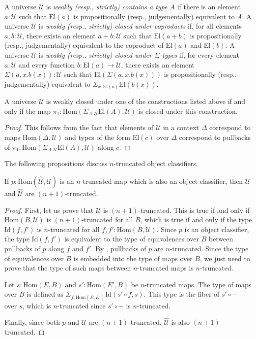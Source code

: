 \documentclass[reqno]{amsart}
\theoremstyle{definition}
\theoremstyle{remark}
\newcommand{\fs}[1]{\mathrm{#1}}
\newcommand{\Hom}{\fs{Hom}}
\newcommand{\Id}{\fs{Id}}
\newcommand{\El}{\fs{El}}
\numberwithin{figure}{section}
\begin{document}
A universe $\mathcal{U}$ is \emph{weakly (resp., strictly) contains a type $A$} if there is an element $a : \mathcal{U}$ such that $\El(a)$ is propositionally (resp., judgementally) equivalent to $A$. 
A universe $\mathcal{U}$ is \emph{weakly (resp., strictly) closed under coproducts} if, for all elements $a,b : \mathcal{U}$, there exists an element $a + b : \mathcal{U}$ such that $\El(a + b)$ is propositionally (resp., judgementally) equivalent to the coproduct of $\El(a)$ and $\El(b)$.
A universe $\mathcal{U}$ is \emph{weakly (resp., strictly) closed under $\Sigma$-types} if, for every element $a : \mathcal{U}$ and every function $b : \El(a) \to \mathcal{U}$, there exists an element $\Sigma(a,x.b(x)) : \mathcal{U}$ such that $\El(\Sigma(a,x.b(x)))$ is propositionally (resp., judgementally) equivalent to $\Sigma_{x : \El(a)} \El(b(x))$.

\begin{prop}
A universe $\mathcal{U}$ is weakly closed under one of the constructions listed above if and only if the map $\pi_1 : \Hom(\Sigma_{A : \mathcal{U}} \El(A), \mathcal{U})$ is closed under this construction.
\end{prop}
\begin{proof}
This follows from the fact that elements of $\mathcal{U}$ in a context $\Delta$ correspond to maps $\Hom(\Delta, \mathcal{U})$ and
types of the form $\El(c)$ over $\Delta$ correspond to pullbacks of $\pi_1 : \Hom(\Sigma_{A : \mathcal{U}} \El(A), \mathcal{U})$ along $c$.
\end{proof}

The following propositions discuss $n$-truncated object classifiers.

\begin{prop}
If $p : \Hom(\widehat{\mathcal{U}},\mathcal{U})$ is an $n$-truncated map which is also an object classifier, then $\mathcal{U}$ and $\widehat{\mathcal{U}}$ are $(n+1)$-truncated.
\end{prop}
\begin{proof}
First, let us prove that $\mathcal{U}$ is $(n+1)$-truncated.
This is true if and only if $\Hom(B,\mathcal{U})$ is $(n+1)$-truncated for all $B$, which is true if and only if the type $\Id(f,f')$ is $n$-truncated for all $f,f' : \Hom(B,\mathcal{U})$.
Since $p$ is an object classifier, the type $\Id(f,f')$ is equivalent to the type of equivalences over $B$ between pullbacks of $p$ along $f$ and $f'$.
By , pullbacks of $p$ are $n$-truncated.
Since the type of equivalences over $B$ is embedded into the type of maps over $B$, we just need to prove that the type of such maps between $n$-truncated maps is $n$-truncated.

Let $s : \Hom(E,B)$ and $s' : \Hom(E',B)$ be $n$-truncated maps.
The type of maps over $B$ is defined as $\Sigma_{f : \Hom(E,E')} \Id(s' \circ f, s)$.
This type is the fiber of $s' \circ -$ over $s$, which is $n$-truncated since $s' \circ -$ is $n$-truncated.

Finally, since both $p$ and $\mathcal{U}$ are $(n+1)$-truncated, $\widehat{\mathcal{U}}$ is also $(n+1)$-truncated.
\end{proof}
\end{document}
